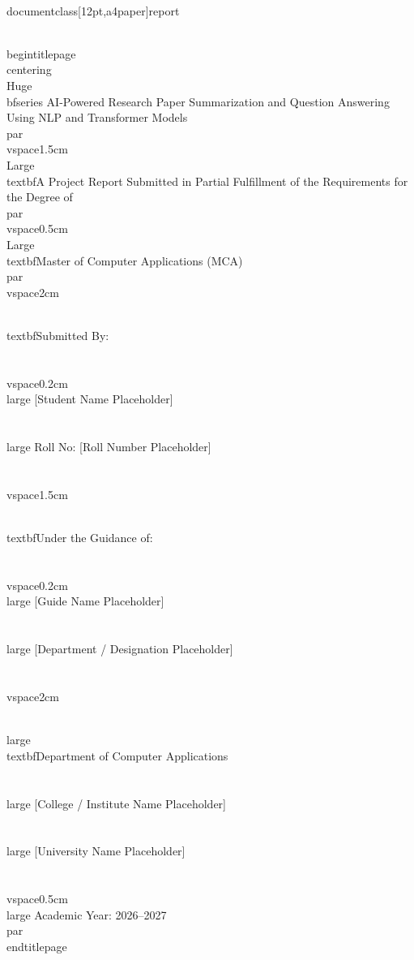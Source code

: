 \\documentclass[12pt,a4paper]{report}
\begin{document}
\\begin{titlepage}
\\centering
{\\Huge \\bfseries AI-Powered Research Paper Summarization and Question Answering Using NLP and Transformer Models\\par}
\\vspace{1.5cm}
{\\Large \\textbf{A Project Report Submitted in Partial Fulfillment of the Requirements for the Degree of}\\par}
\\vspace{0.5cm}
{\\Large \\textbf{Master of Computer Applications (MCA)}\\par}
\\vspace{2cm}

\\textbf{Submitted By:}\\\\
\\vspace{0.2cm}
{\\large [Student Name Placeholder]}\\\\
{\\large Roll No: [Roll Number Placeholder]}\\\\
\\vspace{1.5cm}

\\textbf{Under the Guidance of:}\\\\
\\vspace{0.2cm}
{\\large [Guide Name Placeholder]}\\\\
{\\large [Department / Designation Placeholder]}\\\\
\\vspace{2cm}

{\\large \\textbf{Department of Computer Applications}}\\\\
{\\large [College / Institute Name Placeholder]}\\\\
{\\large [University Name Placeholder]}\\\\
\\vspace{0.5cm}
{\\large Academic Year: 2026--2027\\par}
\\end{titlepage}
\end{document}
